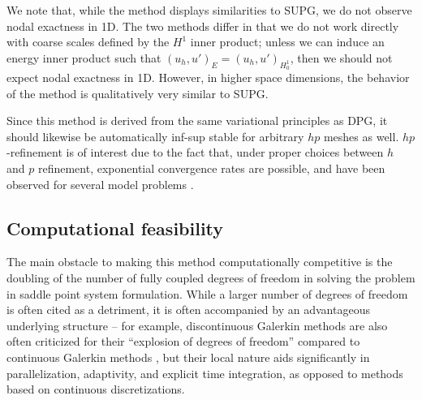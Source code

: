 \documentclass[final,leqno]{siamltex}
\newcommand{\LRp}[1]{\left( #1 \right)}
\begin{document}
We note that, while the method displays similarities to SUPG, we do not observe nodal exactness in 1D.  The two methods differ in that we do not work directly with coarse scales defined by the $H^1$ inner product; unless we can induce an energy inner product such that $\LRp{u_h,u'}_E = \LRp{u_h,u'}_{H^1_0}$, then we should not expect nodal exactness in 1D.  However, in higher space dimensions, the behavior of the method is qualitatively very similar to SUPG.  


%
Since this method is derived from the same variational principles as DPG, it should likewise be automatically inf-sup stable for arbitrary $hp$ meshes as well.  $hp$-refinement is of interest due to the fact that, under proper choices between $h$ and $p$ refinement, exponential convergence rates are possible, and have been observed for several model problems \cite{demkowicz2006computing}.  %
%

\subsection{Computational feasibility}

The main obstacle to making this method computationally competitive is the doubling of the number of fully coupled degrees of freedom in solving the problem in saddle point system formulation.  While a larger number of degrees of freedom is often cited as a detriment, it is often accompanied by an advantageous underlying structure -- for example, discontinuous Galerkin methods are also often criticized for their ``explosion of degrees of freedom'' compared to continuous Galerkin methods \cite{cottrell2007isogeometric}, but their local nature aids significantly in parallelization, adaptivity, and explicit time integration, as opposed to methods based on continuous discretizations.  
\end{document}
